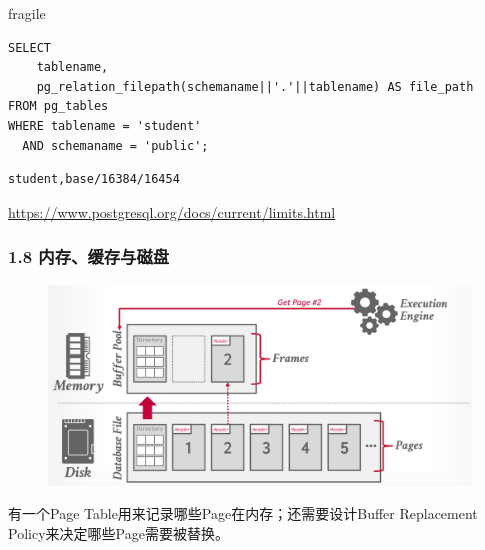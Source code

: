 \documentclass[aspectratio=169, 14pt]{beamer}
\begin{document}
\begin{frame}{fragile}
\begin{figure}
{
		}
	\end{figure}
\end{frame}

\begin{frame}[fragile]
	\begin{verbatim}
SELECT 
    tablename,
    pg_relation_filepath(schemaname||'.'||tablename) AS file_path
FROM pg_tables 
WHERE tablename = 'student'
  AND schemaname = 'public';
  \end{verbatim}

	\begin{verbatim}
student,base/16384/16454
  \end{verbatim}

	\url{https://www.postgresql.org/docs/current/limits.html}
\end{frame}

\begin{frame}[fragile]
	\frametitle{1.8 内存、缓存与磁盘}

	\begin{figure}
		\includegraphics[width=.8\linewidth]{week11/memory}
	\end{figure}

	有一个\alert{Page Table}用来记录哪些Page在内存；还需要设计\alert{Buffer Replacement Policy}来决定哪些Page需要被替换。

\end{frame}
\end{document}
